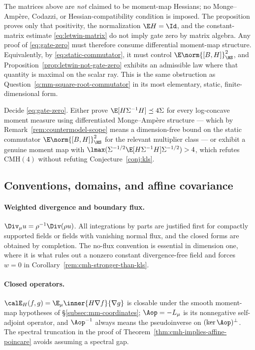 \documentclass[../../main.tex]{subfiles}
\begin{document}
\begin{remark}
\label{rem:countermodel-scope}
The matrices above are \emph{not} claimed to be moment-map Hessians; no Monge--Amp\`ere,
Codazzi, or Hessian-compatibility condition is imposed. The proposition proves only that
positivity, the normalization $\E H=\Id$, and the constant-matrix estimate
\eqref{eq:letwin-matrix} do not imply gate zero by matrix algebra. Any proof of
\eqref{eq:gate-zero} must therefore consume differential moment-map structure. Equivalently, by
\eqref{eq:static-commutator}, it must control $\E\norm{[B,H]}_{\HS}^2$, and
Proposition~\ref{prop:letwin-not-gate-zero} exhibits an admissible law where that quantity is
maximal on the scalar ray. This is the same obstruction as
Question~\ref{q:mm-square-root-commutator} in its most elementary, static,
finite-dimensional form.
\end{remark}

\begin{remark}
\label{q:gate-zero}
Decide \eqref{eq:gate-zero}. Either prove
$\E[H\Sigma^{-1}H]\preceq4\Sigma$ for every log-concave moment measure using differentiated
Monge--Amp\`ere structure --- which by Remark~\ref{rem:countermodel-scope} means a
dimension-free bound on the static commutator $\E\norm{[B,H]}_{\HS}^2$ for the relevant
multiplier class --- or exhibit a genuine moment map with
$\lmax(\Sigma^{-1/2}\E[H\Sigma^{-1}H]\Sigma^{-1/2})>4$, which refutes $\mathrm{CMH}(4)$ without
refuting Conjecture~\ref{conj:kls}.
\end{remark}

\subsection{Conventions, domains, and affine covariance}
\label{subsec:cmh-conventions}

\paragraph{Weighted divergence and boundary flux.}
$\Div_\mu u=\rho^{-1}\Div(\rho u)$. All integrations by parts are justified first for compactly
supported fields or fields with vanishing normal flux, and the closed forms are obtained by
completion. The no-flux convention is essential in dimension one, where it is what rules out a
nonzero constant divergence-free field and forces $w=0$ in
Corollary~\ref{rem:cmh-stronger-than-kls}.

\paragraph{Closed operators.}
$\calE_H(f,g)=\E_\mu\inner{H\nabla f}{\nabla g}$ is closable under the smooth moment-map
hypotheses of \S\ref{subsec:mm-coordinates}; $\Aop=-L_\mu$ is its nonnegative self-adjoint
operator, and $\Aop^{-1}$ always means the pseudoinverse on $(\ker\Aop)^\perp$. The spectral
truncation in the proof of Theorem~\ref{thm:cmh-implies-affine-poincare} avoids assuming a
spectral gap.
\end{document}
